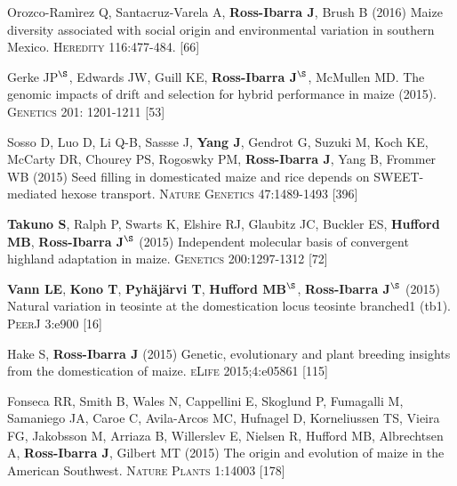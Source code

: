 \documentclass[letterpaper,10pt]{article}
\begin{document}
\begin{etaremune}
\item Orozco-Ram\`{i}rez Q, Santacruz-Varela A, {\bf Ross-Ibarra J}, Brush B (2016) Maize diversity associated with social origin and environmental variation in southern Mexico. \textsc{Heredity} 116:477-484.
 [66]\\


\item Gerke JP$^\S$, Edwards JW, Guill KE, {\bf Ross-Ibarra J}$^\S$, McMullen MD.  The genomic impacts of drift and selection for hybrid performance in maize (2015). \textsc{Genetics}  201: 1201-1211
 [53]\\


\item Sosso D, Luo D, Li Q-B, Sassse J, {\bf Yang J}, Gendrot G, Suzuki M, Koch KE, McCarty DR, Chourey PS, Rogoswky PM, {\bf Ross-Ibarra J}, Yang B, Frommer WB (2015) Seed filling in domesticated maize and rice depends on SWEET-mediated hexose transport. \textsc{Nature Genetics} 47:1489-1493
 [396]\\


\item {\bf Takuno S}, Ralph P, Swarts K, Elshire RJ, Glaubitz JC, Buckler ES, {\bf Hufford MB}, {\bf Ross-Ibarra J}$^\S$ (2015) Independent molecular basis of convergent highland adaptation in maize. \textsc{Genetics} 200:1297-1312
 [72]\\


\item {\bf Vann LE}, {\bf Kono T}, {\bf Pyh\"aj\"arvi T}, {\bf Hufford MB}$^\S$, {\bf Ross-Ibarra J}$^\S$ (2015) Natural variation in teosinte at the domestication locus teosinte branched1 (tb1). \textsc{PeerJ} 3:e900
 [16]\\


\item Hake S, {\bf Ross-Ibarra J} (2015) Genetic, evolutionary and plant breeding insights from the domestication of maize. \textsc{eLife}  2015;4:e05861
 [115]\\


\item Fonseca RR, Smith B, Wales N, Cappellini E, Skoglund P, Fumagalli M, Samaniego JA, Caroe C, Avila-Arcos MC, Hufnagel D, Korneliussen TS, Vieira FG, Jakobsson M, Arriaza B, Willerslev E, Nielsen R, Hufford MB, Albrechtsen A,  {\bf Ross-Ibarra J}, Gilbert MT (2015) The origin and evolution of maize in the American Southwest. \textsc{Nature Plants} 1:14003
 [178]\\


\end{etaremune}
\end{document}
